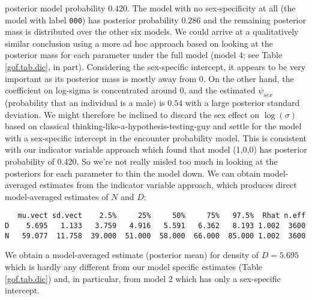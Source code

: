 posterior model probability $0.420$. The model with no sex-specificity
at all (the model with label \mbox{\tt 000}) has
posterior probability $0.286$ and the remaining posterior mass is
distributed over the other six models. We could arrive at a
qualitatively similar conclusion using a more ad hoc approach based
on looking at the posterior mass for each parameter under the
full model (model 4; see Table \ref{gof.tab.dic}, in part). Considering
the sex-specific intercept, it appears to be very important as its
posterior mass is mostly away from 0.  On the other hand, the
coefficient on log-sigma is concentrated around 0, and the estimated
$\psi_{sex}$ (probability that an individual is a male) is $0.54$ with
a large posterior standard deviation.  We might therefore be inclined
to discard the sex effect on $\log(\sigma)$ based on classical
thinking-like-a-hypothesis-testing-guy and settle for the model with a
sex-specific intercept in the encounter probability model. This is consistent with our indicator variable
approach which found that model (1,0,0) has posterior probability of
0.420. So we're not really misled too much in looking at the
posteriors for each parameter to thin the model down.  We can obtain model-averaged estimates
from the indicator variable approach, which produces direct
model-averaged estimates of $N$ and $D$:
{\small
\begin{verbatim}
   mu.vect sd.vect    2.5%     25%     50%     75%   97.5%  Rhat n.eff
D    5.695   1.133   3.759   4.916   5.591   6.362   8.193 1.002  3600
N   59.077  11.758  39.000  51.000  58.000  66.000  85.000 1.002  3600
\end{verbatim}
}
We obtain a model-averaged estimate (posterior mean) for density of $D=5.695$
which is hardly any different from our
model specific estimates (Table \ref{gof.tab.dic}) and, in particular, from model 2
which has only a sex-specific intercept.



